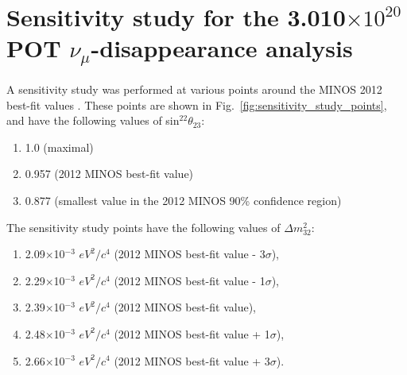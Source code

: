 \clearpage

\section {Sensitivity study for the 3.010$\times10^{20}$ POT $\nu_{\mu}$-disappearance analysis}
\label{appendix:sensitivity_study}

A sensitivity study was performed at various points around the MINOS 2012 best-fit values \cite{MINOS2012}.
These points are shown in Fig.\ \ref{fig:sensitivity_study_points}, and have the following values of sin$^22\theta_{23}$:
\begin{enumerate}  
\item 1.0 (maximal) 
\item 0.957 (2012 MINOS best-fit value)
\item 0.877 (smallest value in the 2012 MINOS 90\% confidence region)
\end{enumerate}
The sensitivity study points have the following values of $\Delta m_{32}^2$:
\begin{enumerate}
\item 2.09$\times$10$^{-3}$ $eV^{2}/c^{4}$ (2012 MINOS  best-fit value - 3$\sigma$),
\item 2.29$\times$10$^{-3}$ $eV^{2}/c^{4}$ (2012 MINOS  best-fit value - 1$\sigma$),
\item 2.39$\times$10$^{-3}$ $eV^{2}/c^{4}$ (2012 MINOS  best-fit value),
\item 2.48$\times$10$^{-3}$ $eV^{2}/c^{4}$ (2012 MINOS  best-fit value + 1$\sigma$),
\item 2.66$\times$10$^{-3}$ $eV^{2}/c^{4}$ (2012 MINOS  best-fit value + 3$\sigma$).
\end{enumerate}

%
%

